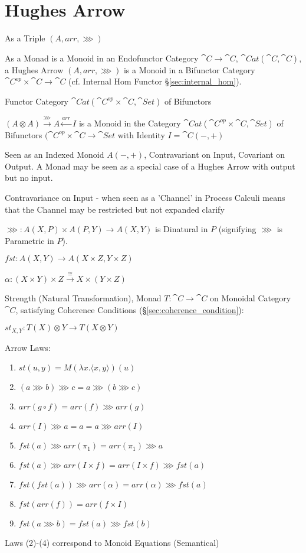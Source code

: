\section{Hughes Arrow}\label{sec:hughes_arrow}

As a Triple $(A, arr, \ggg)$

As a Monad is a Monoid in an Endofunctor Category $\cat{C} \rightarrow
\cat{C}$, $\cat{Cat}(\cat{C},\cat{C})$, a Hughes Arrow $(A, arr,
\ggg)$ is a Monoid in a Bifunctor Category $\cat{C}^{op} \times
\cat{C} \rightarrow \cat{C}$ (cf. Internal Hom Functor
\S\ref{sec:internal_hom}).

Functor Category $\cat{Cat}(\cat{C}^{op} \times \cat{C},
\cat{Set})$ of Bifunctors

$(A \otimes A) \xrightarrow{\ggg} A \xleftarrow{arr} I$ is a Monoid in
the Category $\cat{Cat} (\cat{C}^{op} \times \cat{C}, \cat{Set})$ of
Bifunctors $(\cat{C}^{op} \times \cat{C} \rightarrow \cat{Set}$ with
Identity $I = \cat{C} (-,+)$

Seen as an Indexed Monoid $A(-,+)$, Contravariant on Input, Covariant
on Output. A Monad may be seen as a special case of a Hughes Arrow
with output but no input.

Contravariance on Input - when seen as a 'Channel' in Process Calculi
means that the Channel may be restricted but not expanded %
clarify

$\ggg : A(X,P) \times A(P,Y) \rightarrow A(X,Y)$ is Dinatural in $P$
(signifying $\ggg$ is Parametric in $P$). \cite{jacobs-heunen-hasuo09}

$fst : A(X,Y) \rightarrow A(X \times Z, Y \times Z)$

$\alpha : (X \times Y) \times Z
\xrightarrow{\cong} X \times (Y \times Z)$

Strength (Natural Transformation), Monad $T : \cat{C} \rightarrow
\cat{C}$ on Monoidal Category $\cat{C}$, satisfying Coherence
Conditions (\S\ref{sec:coherence_condition}):

$st_{X,Y} : T(X) \otimes Y \rightarrow T(X \otimes Y)$

Arrow Laws:
\begin{enumerate}
  \item $st(u,y) = M(\lambda x.\langle x,y \rangle)(u)$
  \item $(a \ggg b) \ggg c = a \ggg (b \ggg c)$
  \item $arr (g \circ f) = arr(f) \ggg arr(g)$
  \item $arr(I) \ggg a = a = a \ggg arr(I)$
  \item $fst(a) \ggg arr(\pi_1) = arr(\pi_1) \ggg a$
  \item $fst(a) \ggg arr (I \times f) = arr (I \times f) \ggg fst(a)$
  \item $fst (fst(a)) \ggg arr(\alpha) = arr(\alpha) \ggg fst(a)$
  \item $fst (arr(f)) = arr (f \times I)$
  \item $fst (a \ggg b) = fst(a) \ggg fst(b)$
\end{enumerate}
Laws (2)-(4) correspond to Monoid Equations (Semantical)

